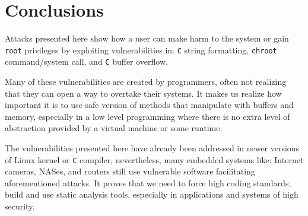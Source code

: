 \documentclass[12pt, a4paper, pdflatex]{article}
\begin{document}
\section{Conclusions}
Attacks presented here show how a user can make harm to the system or gain \texttt{root} privileges by exploiting vulnerabilities in: \texttt{C} string formatting, \texttt{chroot} command/system call, and \texttt{C} buffer overflow.

Many of these vulnerabilities are created by programmers, often not realizing that they can open a way to overtake their systems. It makes us realize how important it is to use safe version of methods that manipulate with buffers and memory, especially in a low level programming where there is no extra level of abstraction provided by a virtual machine or some runtime.

The vulnerabilities presented here have already been addressed in newer versions of Linux kernel or \texttt{C} compiler, nevertheless, many embedded systems like: Internet cameras, NASes, and routers still use vulnerable software facilitating aforementioned attacks. It proves that we need to force high coding standards, build and use static analysis tools, especially in applications and systems of high security.

\vfill



\newpage
\begin{appendices}

\end{appendices}
\end{document}
